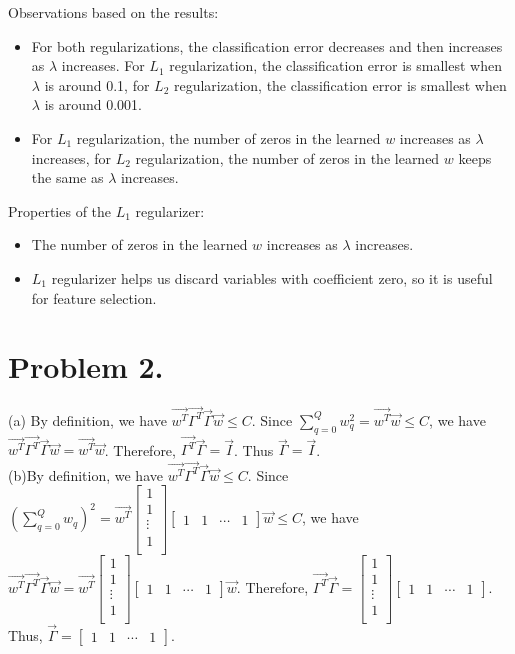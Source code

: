 \documentclass{article}
\begin{document}
    Observations based on the results:
    \begin{itemize}
        \item For both regularizations, the classification error decreases and then increases as $\lambda$ 
        increases. For $L_1$ regularization, the classification error is smallest when $\lambda$ is around 0.1, 
        for $L_2$ regularization, the classification error is smallest when $\lambda$ is around 0.001.
        \item For $L_1$ regularization, the number of zeros in the learned $w$ increases as $\lambda$ increases,
        for $L_2$ regularization, the number of zeros in the learned $w$ keeps the same as $\lambda$ increases.
    \end{itemize}
    Properties of the $L_1$ regularizer:
    \begin{itemize}
        \item The number of zeros in the learned $w$ increases as $\lambda$ increases.
        \item $L_1$ regularizer helps us discard variables with coefficient zero, so it is useful for feature 
        selection.
    \end{itemize}

    \section*{Problem 2.}
    \def\A{
        \begin{bmatrix}
            1 \\
            1 \\
            \vdots \\
            1 \\
        \end{bmatrix}
    }
    \def\B{
        \begin{bmatrix}
            1 & 1 & \cdots & 1
        \end{bmatrix}
    }
    (a) By definition, we have 
    $\overset{\to}{w^T} \overset{\to}{\Gamma^T} \overset{\to}{\Gamma} \overset{\to}{w} \leq C$.
    Since $\sum_{q=0}^{Q}w_q^2 = \overset{\to}{w^T} \overset{\to}{w} \leq C$, we have 
    $\overset{\to}{w^T} \overset{\to}{\Gamma^T} \overset{\to}{\Gamma} \overset{\to}{w} = 
    \overset{\to}{w^T} \overset{\to}{w}$. Therefore, 
    $\overset{\to}{\Gamma^T} \overset{\to}{\Gamma} = \overset{\to}{I}$. Thus 
    $\overset{\to}{\Gamma} = \overset{\to}{I}$.\\
    (b)By definition, we have 
    $\overset{\to}{w^T} \overset{\to}{\Gamma^T} \overset{\to}{\Gamma} \overset{\to}{w} \leq C$.
    Since $(\sum_{q=0}^{Q}w_q)^2 = \overset{\to}{w^T} \A \B \overset{\to}{w} \leq C$, we have
    $\overset{\to}{w^T} \overset{\to}{\Gamma^T} \overset{\to}{\Gamma} \overset{\to}{w} =
    \overset{\to}{w^T} \A \B \overset{\to}{w}$. Therefore, $\overset{\to}{\Gamma^T} \overset{\to}{\Gamma} =
    \A \B$. Thus, $\overset{\to}{\Gamma} = \B$.
\end{document}
